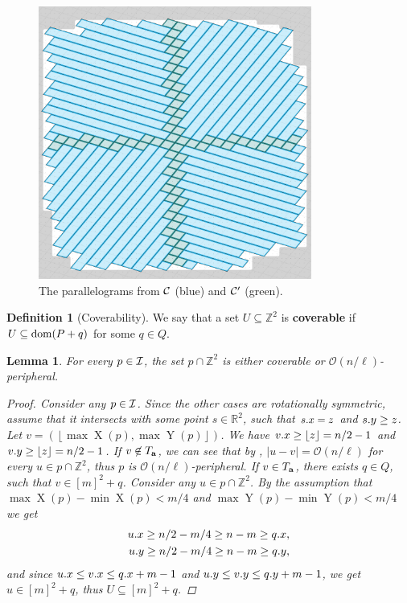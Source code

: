 \documentclass[11pt]{article}
\newcommand{\R}{\mathbb{R}}
\newcommand{\Z}{\mathbb{Z}}
\renewcommand{\O}{\mathcal{O}}
\newcommand{\floor}[1]{\left\lfloor #1 \right\rfloor}
\newcommand{\eq}[1]{\begin{align*} #1 \end{align*}}
\theoremstyle{plain}
\newtheorem{lemma}{Lemma}
\theoremstyle{definition}
\newtheorem{definition}{Definition}
\theoremstyle{remark}
\DeclareMathOperator*{\X}{X}
\DeclareMathOperator*{\Y}{Y}
\begin{document}
\begin{figure}[!t]
	\begin{center}
		\includegraphics[width=0.8\textwidth]{drawings/text_decomposition}
	\end{center}
	\caption{The parallelograms from $\mathcal{C}$ (blue) and $\mathcal{C}'$ (green).}
	\label{figure:text_decomposition}
\end{figure}

\begin{definition}[Coverability]
	We say that a set $U \subseteq \Z^2$ is \textbf{coverable} if $U \subseteq \operatorname*{dom}(P + q)$ for some $q \in Q$.
\end{definition}

\begin{lemma}\label{I_division}
	For every $p \in \mathcal{I}$, the set $p \cap \Z^2$ is either coverable or $\O(n / \ell)$-peripheral.
	\begin{proof}
		Consider any $p \in \mathcal{I}$.
		Since the other cases are rotationally symmetric, assume that it intersects with some point $s \in \R^2$, such that $s.x = z$ and $s.y \ge z$.
		Let $v = (\floor{\max \X(p), \max \Y(p)})$.
		We have $\x{v} \ge \floor{z} = n / 2 - 1$ and $\y{v} \ge \floor{z} = n / 2 - 1$.
		If $v \not \in T_\mathbf{a}$, we can see that by ,
		$|u - v| = \O(n / \ell)$ for every $u \in p \cap \Z^2$, thus $p$ is $\O(n / \ell)$-peripheral.
		If $v \in T_\mathbf{a}$, there exists $q \in Q$, such that $v \in [m]^2 + q$.
		Consider any $u \in p \cap \Z^2$.
		By the assumption that $\max \X(p) - \min \X(p) < m / 4$ and $\max \Y(p) - \min \Y(p) < m / 4$ we get
		\eq{
			\x{u} \ge n / 2 - m / 4 \ge n - m \ge \x{q},\\ 
			\y{u} \ge n / 2 - m / 4 \ge n - m \ge \y{q},
		}
		and since $u.x \le v.x \le q.x + m - 1$ and $u.y \le v.y \le q.y + m - 1$, we get $u \in [m]^2 + q$, thus $U \subseteq [m]^2 + q$.
	\end{proof}
\end{lemma}
\end{document}
